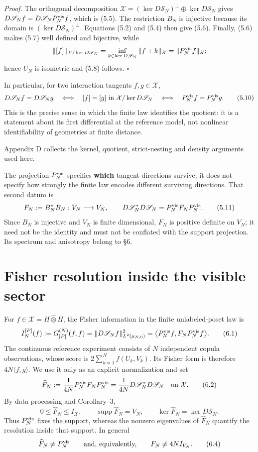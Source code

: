 \documentclass[11pt]{article}
\begin{document}
\emph{Proof.} The orthogonal decomposition \(\mathcal X=(\ker D\mathscr S_N)^\perp\oplus\ker D\mathscr S_N\) gives \(D\mathscr S_Nf=D\mathscr S_NP_N^{\rm vis}f\), which is (5.5). The restriction \(B_N\) is injective because its domain is \((\ker D\mathscr S_N)^\perp\). Equations (5.2) and (5.4) then give (5.6). Finally, (5.6) makes (5.7) well defined and bijective, while \[ \|[f]\|_{\mathcal X/\ker D\mathscr S_N} =\inf_{k\in\ker D\mathscr S_N}\|f+k\|_{\mathcal X} =\|P_N^{\rm vis}f\|_{\mathcal X}; \] hence \(U_N\) is isometric and (5.8) follows. \(\square\)

In particular, for two interaction tangents \(f,g\in\mathcal X\), \[ D\mathscr S_Nf=D\mathscr S_Ng \quad\Longleftrightarrow\quad [f]=[g]\text{ in }\mathcal X/\ker D\mathscr S_N \quad\Longleftrightarrow\quad P_N^{\rm vis}f=P_N^{\rm vis}g. \tag{5.10} \] This is the precise sense in which the finite law identifies the quotient: it is a statement about its first differential at the reference model, not nonlinear identifiability of geometries at finite distance.

Appendix D collects the kernel, quotient, strict-nesting and density arguments used here.

The projection \(P_N^{\rm vis}\) specifies \textbf{which} tangent directions survive; it does not specify how strongly the finite law encodes different surviving directions. That second datum is \[ F_N:=B_N^*B_N:V_N\longrightarrow V_N, \qquad D\mathscr S_N^*D\mathscr S_N =P_N^{\rm vis}F_NP_N^{\rm vis}. \tag{5.11} \] Since \(B_N\) is injective and \(V_N\) is finite dimensional, \(F_N\) is positive definite on \(V_N\); it need not be the identity and must not be conflated with the support projection. Its spectrum and anisotropy belong to \S6.

\section{Fisher resolution inside the visible sector}

For \(f\in\mathcal X=H\widehat\otimes H\), the Fisher information in the finite unlabeled-poset law is \[ I_N^{[P]}(f) :=G_{[P]}^{(N)}(f,f) =\|D\mathscr S_Nf\|_{L^2(\mu_{N,0})}^2 =\big\langle P_N^{\rm vis}f, F_NP_N^{\rm vis}f\big\rangle. \tag{6.1} \] The continuous reference experiment consists of \(N\) independent copula observations, whose score is \(2\sum_{k=1}^Nf(U_k,V_k)\). Its Fisher form is therefore \(4N\langle f,g\rangle\). We use it only as an explicit normalization and set \[ \widehat F_N :=\frac1{4N}P_N^{\rm vis}F_NP_N^{\rm vis} =\frac1{4N}D\mathscr S_N^*D\mathscr S_N \quad\text{on }\mathcal X. \tag{6.2} \] By data processing and Corollary~3, \[ 0\le\widehat F_N\le I_{\mathcal X}, \qquad \operatorname{supp}\widehat F_N=V_N, \qquad \ker\widehat F_N=\ker D\mathscr S_N. \tag{6.3} \] Thus \(P_N^{\rm vis}\) fixes the support, whereas the nonzero eigenvalues of \(\widehat F_N\) quantify the resolution inside that support. In general \[ \widehat F_N\ne P_N^{\rm vis} \qquad\text{and, equivalently,}\qquad F_N\ne4N I_{V_N}. \tag{6.4} \]
\end{document}

